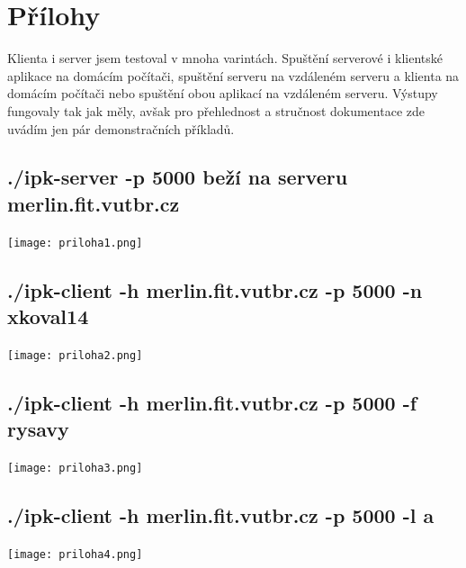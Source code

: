 \documentclass[11pt]{article}
\begin{document}
	\newpage		
	\section{Přílohy}
			Klienta i server jsem testoval v mnoha varintách. Spuštění serverové i klientské aplikace na domácím počítači, spuštění serveru na vzdáleném serveru a klienta na domácím počítači nebo spuštění obou aplikací na vzdáleném serveru. Výstupy fungovaly tak jak měly, avšak pro přehlednost a stručnost dokumentace zde uvádím jen pár demonstračních příkladů.
		\subsection{./ipk-server -p 5000 beží na serveru merlin.fit.vutbr.cz}
	\begin{center}
		\texttt{[image: priloha1.png]}\\
	\end{center}

	\subsection{./ipk-client -h merlin.fit.vutbr.cz -p 5000 -n xkoval14}
	\begin{center}
		\texttt{[image: priloha2.png]}\\
	\end{center}
	
	\subsection{./ipk-client -h merlin.fit.vutbr.cz -p 5000 -f rysavy}
	\begin{center}
		\texttt{[image: priloha3.png]}\\
	\end{center}
	
	\subsection{./ipk-client -h merlin.fit.vutbr.cz -p 5000 -l a}
	\begin{center}
		\texttt{[image: priloha4.png]}\\
	\end{center}
	

	
	\vfill
	
\end{document}
